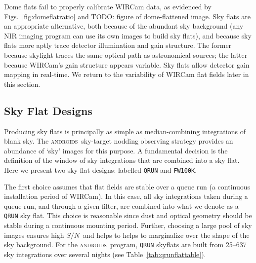 \documentclass[iop]{emulateapj}
\newcommand{\sn}{\ensuremath{S/N}} %
\newcommand{\androids}{\textsc{androids}}
\newcommand{\todo}[1]{\textcolor{BurntOrange}{\textsf{#1}}} %
\newcommand{\Tab}[1]{Table~\ref{tab:#1}}  %
\begin{document}
Dome flats fail to properly calibrate WIRCam data, as evidenced by Figs.~\ref{fig:domeflatratio} and \todo{TODO: figure of dome-flattened image}.
Sky flats are an appropriate alternative, both because of the abundant sky background (any NIR imaging program can use its own images to build sky flats), and because sky flats more aptly trace detector illumination and gain structure.
The former because skylight traces the same optical path as astronomical sources; the latter because WIRCam's gain structure appears variable.
Sky flats allow detector gain mapping in real-time.
We return to the variability of WIRCam flat fields later in this section.

\subsection{Sky Flat Designs}
\label{sec:flatdesign}

Producing sky flats is principally as simple as median-combining integrations of blank sky. 
The \androids\ sky-target nodding observing strategy provides an abundance of `sky' images for this purpose.
A fundamental decision is the definition of the window of sky integrations that are combined into a sky flat.
Here we present two sky flat designs: labelled \texttt{QRUN} and \texttt{FW100K}.

The first choice assumes that flat fields are stable over a queue run (a continuous installation period of WIRCam).
In this case, all sky integrations taken during a queue run, and through a given filter, are combined into what we denote as a \texttt{QRUN} sky flat.
This choice is reasonable since dust and optical geometry should be stable during a continuous mounting period.
Further, choosing a large pool of sky images ensures high \sn\, and helps to helps to marginalize over the shape of the sky background.
For the \androids\ program, \texttt{QRUN} skyflats are built from 25--637 sky integrations over several nights (see \Tab{qrunflattable}).
\end{document}
